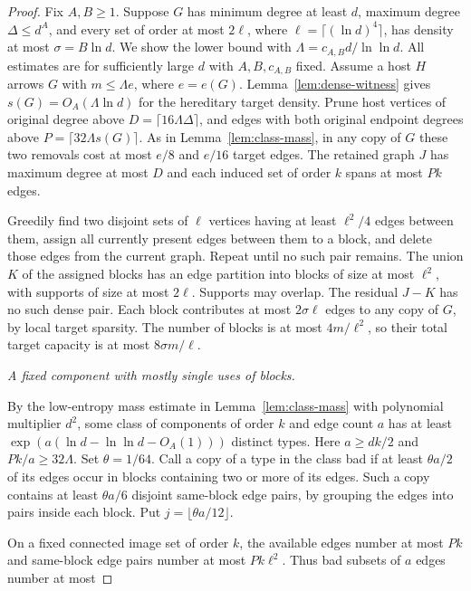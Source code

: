 \documentclass[11pt]{amsart}
\theoremstyle{definition}
\theoremstyle{remark}
\numberwithin{equation}{section}
\begin{document}
\begin{proof}

Fix $A,B\ge1$. Suppose $ G $ has minimum degree at least $ d $, maximum degree $\Delta\le d^A $, and every set of order at most $2\ell $, where $\ell=\lceil(\ln d)^4\rceil $, has density at most $\sigma=B\ln d $. We show the lower bound with $\Lambda=c_{A,B}d/\ln\ln d $. All estimates are for sufficiently large $ d $ with $ A,B,c_{A,B}$ fixed. Assume a host $ H $ arrows $ G $ with $ m\le\Lambda e $, where $ e=e(G)$. Lemma~\ref{lem:dense-witness} gives $ s(G)=O_A(\Lambda\ln d)$ for the hereditary target density. Prune host vertices of original degree above $ D=\lceil16\Lambda\Delta\rceil $, and edges with both original endpoint degrees above $ P=\lceil32\Lambda s(G)\rceil $. As in Lemma~\ref{lem:class-mass}, in any copy of $ G $ these two removals cost at most $ e/8$ and $ e/16$ target edges. The retained graph $ J $ has maximum degree at most $ D $ and each induced set of order $ k $ spans at most $ Pk$ edges.

Greedily find two disjoint sets of $\ell $ vertices having at least $\ell^2/4$ edges between them, assign all currently present edges between them to a block, and delete those edges from the current graph. Repeat until no such pair remains. The union $ K $ of the assigned blocks has an edge partition into blocks of size at most $\ell^2$, with supports of size at most $2\ell $. Supports may overlap. The residual $ J-K $ has no such dense pair. Each block contributes at most $2\sigma\ell $ edges to any copy of $ G $, by local target sparsity. The number of blocks is at most $4m/\ell^2$, so their total target capacity is at most $8\sigma m/\ell$.

\medskip\noindent\emph{A fixed component with mostly single uses of blocks.}

By the low-entropy mass estimate in Lemma~\ref{lem:class-mass} with polynomial multiplier $d^2$, some class of components of order $ k $ and edge count $ a $ has at least $\exp(a(\ln d-\ln\ln d-O_A(1)))$ distinct types. Here $ a\ge dk/2$ and $ Pk/a\ge32\Lambda $. Set $\theta=1/64$. Call a copy of a type in the class bad if at least $\theta a/2$ of its edges occur in blocks containing two or more of its edges. Such a copy contains at least $\theta a/6$ disjoint same-block edge pairs, by grouping the edges into pairs inside each block. Put $ j=\lfloor\theta a/12\rfloor$.

On a fixed connected image set of order $k $, the available edges number at most $ Pk $ and same-block edge pairs number at most $ Pk\ell^2$. Thus bad subsets of $ a$ edges number at most


\end{proof}
\end{document}
